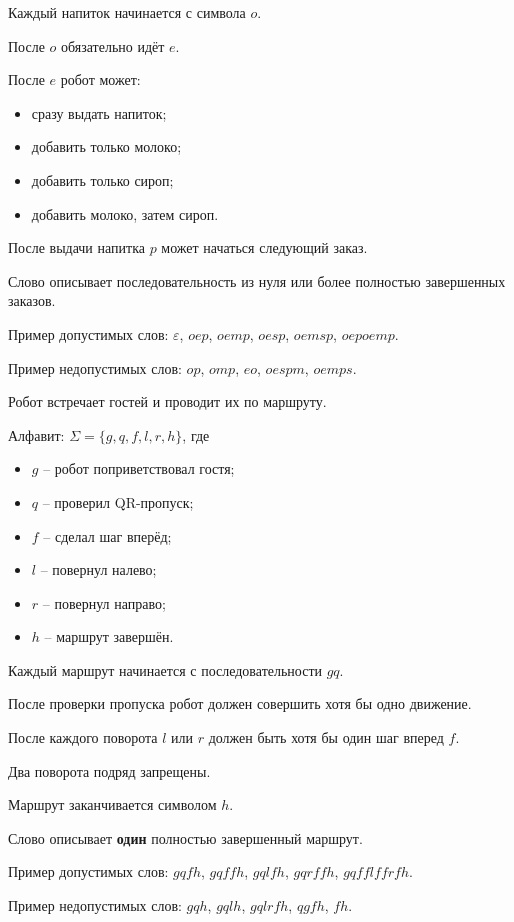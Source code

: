 \documentclass[a4paper,12pt,oneside]{article}
\begin{document}
\begin{numlist}
  \item Каждый напиток начинается с символа $o$.
  \item После $o$ обязательно идёт $e$.
  \item После $e$ робот может:
    \begin{itemize}
      \item сразу выдать напиток;
      \item добавить только молоко;
      \item добавить только сироп;
      \item добавить молоко, затем сироп.
    \end{itemize}
  \item После выдачи напитка $p$ может начаться следующий заказ.
  \item Слово описывает последовательность из нуля или более полностью завершенных заказов.
\end{numlist}

\noindent Пример допустимых слов: $\varepsilon$, $oep$, $oemp$, $oesp$, $oemsp$, $oepoemp$.

\noindent Пример недопустимых слов: $op$, $omp$, $eo$, $oespm$, $oemps$.

\newpage
{}
Робот встречает гостей и проводит их по маршруту.

\noindent Алфавит: $\Sigma=\{g,q,f,l,r,h\}$, где
\begin{itemize}
  \item $g$ -- робот поприветствовал гостя;
  \item $q$ -- проверил QR-пропуск;
  \item $f$ -- сделал шаг вперёд;
  \item $l$ -- повернул налево;
  \item $r$ -- повернул направо;
  \item $h$ -- маршрут завершён.
\end{itemize}

\begin{numlist}
  \item Каждый маршрут начинается с последовательности $gq$.
  \item После проверки пропуска робот должен совершить хотя бы одно движение.
  \item После каждого поворота $l$ или $r$ должен быть хотя бы один шаг вперед $f$.
  \item Два поворота подряд запрещены.
  \item Маршрут заканчивается символом $h$.
  \item Слово описывает \textbf{один} полностью завершенный маршрут.
\end{numlist}

\noindent Пример допустимых слов: $gqfh$, $gqffh$, $gqlfh$, $gqrffh$, $gqfflffrfh$.

\noindent Пример недопустимых слов: $gqh$, $gqlh$, $gqlrfh$, $qgfh$, $fh$.
\end{document}
